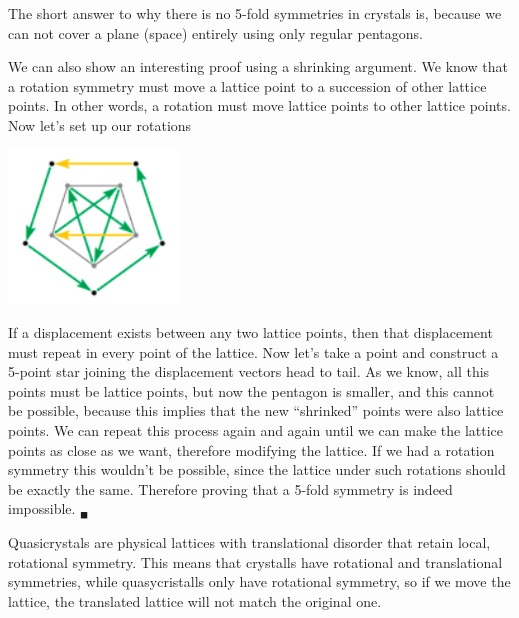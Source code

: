 \begin{questions}
\begin{solution} The short answer to why there is no 5-fold symmetries in crystals is, because we can not cover a plane (space) entirely using only regular pentagons.

We can also show an interesting proof using a shrinking argument. We know that a rotation symmetry must move a lattice point to a succession of other lattice points. In other words, a rotation must move lattice points to other lattice points. Now let's set up our rotations

\begin{center}
  \includegraphics[width=45mm]{shrink}
\end{center}

\label{shrink} \vspace{0.5cm}

If a displacement exists between any two lattice points, then that displacement must repeat in every point of the lattice. Now let's take a point and construct a 5-point star joining the displacement vectors head to tail. As we know, all this points must be lattice points, but now the pentagon is smaller, and this cannot be possible, because this implies that the new ``shrinked'' points were also lattice points. We can repeat this process again and again until we can make the lattice points as close as we want, therefore modifying the lattice. If we had a rotation symmetry this wouldn't be possible, since the lattice under such rotations should be exactly the same. Therefore proving that a 5-fold symmetry is indeed impossible. $_\blacksquare$


\end{solution}

\begin{solution}
  Quasicrystals are physical lattices with translational disorder that retain local, rotational symmetry. This means that crystalls have rotational and translational symmetries, while quasycristalls only have rotational symmetry, so if we move the lattice, the translated lattice will not match the original one.
\end{solution}
\end{questions}

%
%
